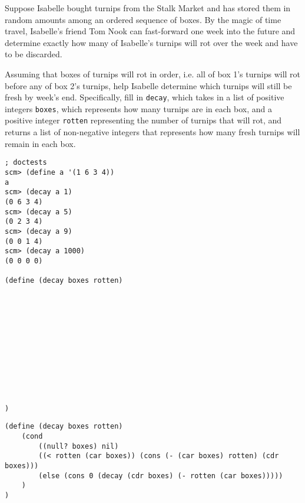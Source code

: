 \begin{blocksection}
\question
Suppose Isabelle bought turnips from the Stalk Market and has stored them in random amounts among an ordered sequence of boxes. By the magic of time travel, Isabelle's friend Tom Nook can fast-forward one week into the future and determine exactly how many of Isabelle's turnips will rot over the week and have to be discarded.

Assuming that boxes of turnips will rot in order, i.e. all of box 1's turnips will rot before any of box 2's turnips, help Isabelle determine which turnips will still be fresh by week's end. Specifically, fill in \lstinline{decay}, which takes in a list of positive integers \lstinline{boxes}, which represents how many turnips are in each box, and a positive integer \lstinline{rotten} representing the number of turnips that will rot, and returns a list of non-negative integers that represents how many fresh turnips will remain in each box.

\begin{lstlisting}
; doctests
scm> (define a '(1 6 3 4))
a
scm> (decay a 1)
(0 6 3 4)
scm> (decay a 5)
(0 2 3 4)
scm> (decay a 9)
(0 0 1 4)
scm> (decay a 1000)
(0 0 0 0)

(define (decay boxes rotten)












)
\end{lstlisting}
\end{blocksection}

\begin{blocksection}
\begin{solution}
\begin{lstlisting}
(define (decay boxes rotten)
    (cond 
        ((null? boxes) nil)
        ((< rotten (car boxes)) (cons (- (car boxes) rotten) (cdr boxes)))
        (else (cons 0 (decay (cdr boxes) (- rotten (car boxes)))))
    )
)
\end{lstlisting}
\end{solution}
\end{blocksection}

